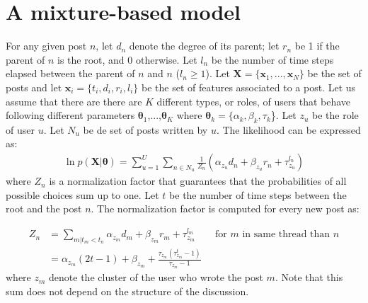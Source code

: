 \documentclass[smallextended]{svjour3}          %
\begin{document}
\section{A mixture-based model}
For any given post $n$, let $d_n$ denote the degree of its parent; let $r_n$ be 1 if the parent of $n$ is the root, and 0 otherwise. Let $l_n$ be the number of time steps elapsed between the parent of $n$ and $n$ ($l_n \geq 1$). Let $\mathbf{X} = \{\mathbf{x}_1,...,\mathbf{x}_N\}$ be the set of posts and let $\mathbf{x}_i = \{t_i, d_i, r_i, l_i\}$  be the set of features associated to a post. Let us assume that there are there are $K$ different types, or roles, of users that behave following different parameters $\boldsymbol{\theta}_1$,...,$\boldsymbol{\theta}_K$ where  $\boldsymbol{\theta}_k = \{\alpha_k, \beta_k, \tau_k$\}. Let $z_u$ be the role of user $u$. Let $N_u$ be de set of posts written by $u$. The likelihood can be expressed as:
\begin{align}
\ln p(\mathbf{X} | \boldsymbol{\theta}) = 
\sum_{u=1}^U \sum_{n \in N_u} 
\frac{1}{Z_n}\left(\alpha_{z_u} d_{n} + \beta_{z_u}r_{n} + \tau_{z_u}^{l_n}\right)
\end{align}
where $Z_n$ is a normalization factor that guarantees that the probabilities of all possible choices sum up to one. Let $t$ be the number of time steps between the root and the post $n$. The normalization factor is computed for every new post as:

\begin{align*}
Z_n &=  
\sum_{m | t_m < t_n} \alpha_{z_m} d_m + \beta_{z_m} r_m + \tau_{z_m}^{l_m} \qquad\text{for $m$ in same thread than $n$}
\\&=
\alpha_{z_m}(2t -1) + \beta_{z_m} + \frac{\tau_{z_m}(\tau_{z_m}^t-1)}{\tau_{z_m}-1}
\end{align*}
where $z_m$ denote the cluster of the user who wrote the post $m$. Note that this sum does not depend on the structure of the discussion.
\end{document}
